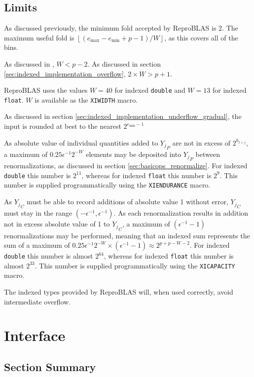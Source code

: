 \documentclass[12pt]{article}
\providecommand{\floor}[1]{\left \lfloor #1 \right \rfloor }
\providecommand{\min}{\ensuremath{\text{min}}}
\providecommand{\max}{\ensuremath{\text{max}}}
\theoremstyle{definition}
\numberwithin{equation}{section}
\begin{document}
  \subsection{Limits}
    \label{sec:basicops_limits}
    As discussed previously, the minimum fold accepted by ReproBLAS is 2. The maximum useful fold is $\floor{(e_{\max} - e_{\min} + p - 1)/W}$, as this covers all of the bins.

    As discussed in \cite{repsum}, $W < p - 2$. As discussed in section \ref{sec:indexed_implementation_overflow}, $2\times W > p + 1$.

    ReproBLAS uses the values $W = 40$ for indexed \verb|double| and $W = 13$ for indexed \verb|float|. $W$ is available as the \verb|XIWIDTH| macro.

    As discussed in section \ref{sec:indexed_implementation_underflow_gradual}, the input is rounded at best to the nearest $2^{e_{\min} - 1}$

    As absolute value of individual quantities added to ${Y_j}_P$ are not in excess of $2^{b_{I + j}}$, a maximum of $0.25\epsilon^{-1}2^{-W}$ elements may be deposited into ${Y_j}_P$ between renormalizations, as discussed in section \ref{sec:basicops_renormalize}. For indexed \verb|double| this number is $2^{11}$, whereas for indexed \verb|float| this number is $2^9$. This number is supplied programmatically using the \verb|XIENDURANCE| macro.

    As ${Y_j}_C$ must be able to record additions of absolute value 1 without error, ${Y_j}_C$ must stay in the range $(-\epsilon^{-1}, \epsilon^{-1})$. As each renormalization results in addition not in excess absolute value of 1 to ${Y_j}_C$, a maximum of $(\epsilon^{-1} - 1)$ renormalizations may be performed, meaning that an indexed sum represents the sum of a maximum of $0.25\epsilon^{-1}2^{-W} \times (\epsilon^{-1} - 1) \approx 2^{p + p - W - 2}$. For indexed \verb|double| this number is almost $2^{64}$, whereas for indexed \verb|float| this number is almost $2^{33}$. This number is supplied programmatically using the \verb|XICAPACITY| macro.

    The indexed types provided by ReproBLAS will, when used correctly, avoid intermediate overflow.

\section{Interface}
  \subsection{Section Summary}
\end{document}
